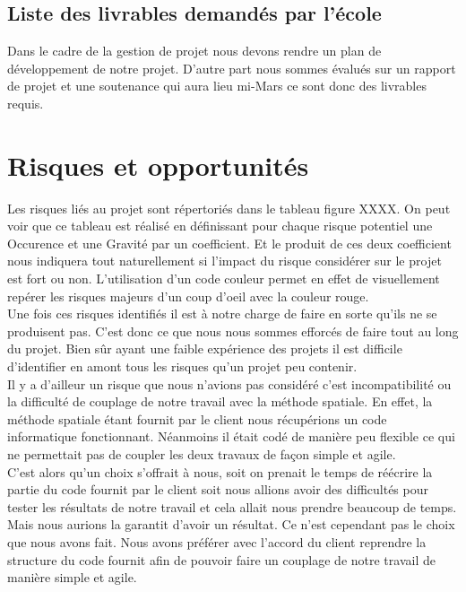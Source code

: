 \documentclass[a4paper,12pt]{report}
\theoremstyle{break}
\begin{document}
\subsection{Liste des livrables demandés par l’école }

    Dans le cadre de la gestion de projet nous devons rendre un plan de développement de notre projet. D’autre part nous sommes évalués sur un rapport de projet et une soutenance qui aura lieu mi-Mars ce sont donc des livrables requis. 

\section{Risques et opportunités}
 
  Les risques liés au projet sont répertoriés dans le tableau figure XXXX. On peut voir que ce tableau est réalisé en définissant pour chaque risque potentiel une Occurence et une Gravité par un coefficient. Et le produit de ces deux coefficient nous indiquera tout naturellement si l'impact du risque considérer sur le projet est fort ou non. L'utilisation d'un code couleur permet en effet de visuellement repérer les risques majeurs d'un coup d'oeil avec la couleur rouge. \\
  
  Une fois ces risques identifiés il est à notre charge de faire en sorte qu'ils ne se produisent pas. C'est donc ce que nous nous sommes efforcés de faire tout au long du projet. Bien sûr ayant une faible expérience des projets il est difficile d'identifier en amont tous les risques qu'un projet peu contenir. \\
  
  Il y a d'ailleur un risque que nous n’avions pas considéré c’est incompatibilité ou la difficulté de couplage de notre travail avec la méthode spatiale. En effet, la méthode spatiale étant fournit par le client nous récupérions un code informatique fonctionnant. Néanmoins il était codé de manière peu flexible ce qui ne permettait pas de coupler les deux travaux de façon simple et agile.\\
  
 C'est alors qu'un choix s'offrait à nous, soit on prenait le temps de réécrire la partie du code fournit par le client soit nous allions avoir des difficultés pour tester les résultats de notre travail et cela allait nous prendre beaucoup de temps. Mais nous aurions la garantit d'avoir un résultat. Ce n'est cependant pas le choix que nous avons fait. Nous avons préférer avec l'accord du client reprendre la structure du code fournit afin de pouvoir faire un couplage de notre travail de manière simple et agile. \\ 
 
\end{document}
